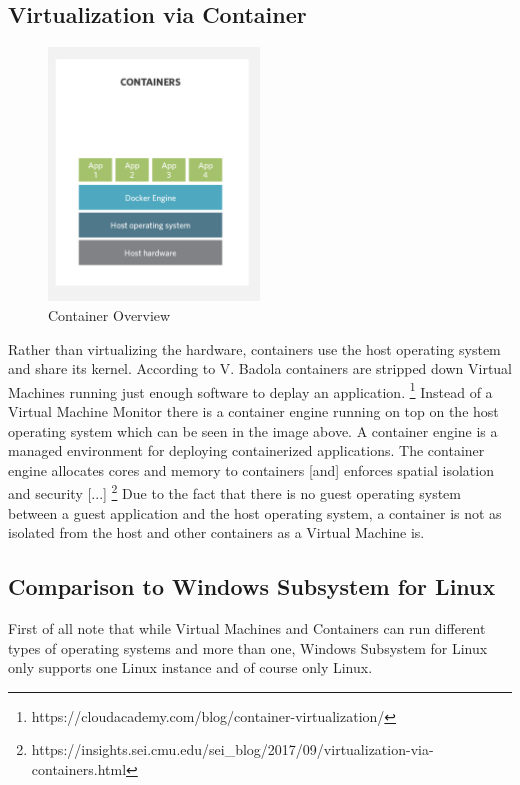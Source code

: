 \documentclass[utf8,biblatex]{lni}
\begin{document}
\subsection{Virtualization via Container}

\begin{figure}
  \centering
  \includegraphics[width=0.5\textwidth]{Container.pdf}
  \caption{Container Overview}
  \label{img:container}
\end{figure}

Rather than virtualizing the hardware, containers use the host operating system and share its kernel. According to V. Badola containers are stripped down Virtual Machines running just enough software to deplay an application. \footnote{https://cloudacademy.com/blog/container-virtualization/} Instead of a Virtual Machine Monitor there is a container engine running on top on the host operating system which can be seen in the image above. \glqq A container engine is a managed environment for deploying containerized applications. The container engine allocates cores and memory to containers [and] enforces spatial isolation and security [...] \glqq \footnote{https://insights.sei.cmu.edu/sei_blog/2017/09/virtualization-via-containers.html}
Due to the fact that there is no guest operating system between a guest application and the host operating system, a container is not as isolated from the host and other containers as a Virtual Machine is.

\subsection{Comparison to Windows Subsystem for Linux}

First of all note that while Virtual Machines and Containers can run different types of operating systems and more than one, Windows Subsystem for Linux only supports one Linux instance and of course only Linux.
\end{document}
